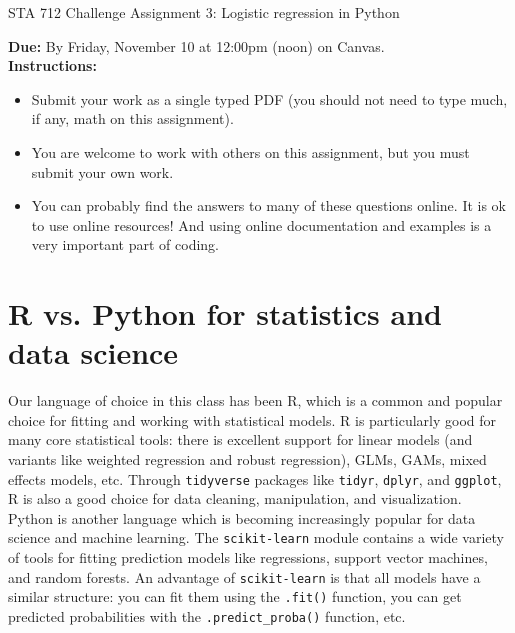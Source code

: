 \documentclass[11pt]{article}
\begin{document}
\begin{center}
\Large
STA 712 Challenge Assignment 3: Logistic regression in Python\\
\normalsize
\vspace{5mm}
\end{center}

\noindent \textbf{Due:} By Friday, November 10 at 12:00pm (noon) on Canvas.\\

\noindent \textbf{Instructions:} 
\begin{itemize}
\item Submit your work as a single typed PDF (you should not need to type much, if any, math on this assignment).
\item You are welcome to work with others on this assignment, but you must submit your own work.
\item You can probably find the answers to many of these questions online. It is ok to use online resources! And using online documentation and examples is a very important part of coding.
\end{itemize}

\section*{R vs. Python for statistics and data science}

Our language of choice in this class has been R, which is a common and popular choice for fitting and working with statistical models. R is particularly good for many core statistical tools: there is excellent support for linear models (and variants like weighted regression and robust regression), GLMs, GAMs, mixed effects models, etc. Through \texttt{tidyverse} packages like \texttt{tidyr}, \texttt{dplyr}, and \texttt{ggplot}, R is also a good choice for data cleaning, manipulation, and visualization.\\

\noindent Python is another language which is becoming increasingly popular for data science and machine learning. The \texttt{scikit-learn} module contains a wide variety of tools for fitting prediction models like regressions, support vector machines, and random forests. An advantage of \texttt{scikit-learn} is that all models have a similar structure: you can fit them using the \texttt{.fit()} function, you can get predicted probabilities with the \texttt{.predict\_proba()} function, etc.\\
\end{document}
